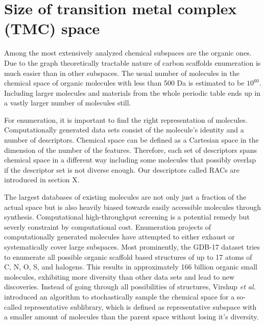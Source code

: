 \documentclass{article}
\begin{document}

\section{Size of transition metal complex (TMC) space}
Among the most extensively analyzed chemical subspaces are the organic ones. Due to the graph theoretically tractable nature of carbon scaffolds enumeration is much easier than in other subspaces. The usual number of molecules in the chemical space of organic molecules with less than 500 Da is estimated to be $10^{60}$.\cite{blair1932,polishchuk2013,bohacek1998,wester2008,triggle2009} Including larger molecules and materials from the whole periodic table ends up in a vastly larger number of molecules still.

For enumeration, it is important to find the right representation of molecules.\cite{bartok2013,ghiringhelli2015} Computationally generated data sets consist of the molecule's identity and a number of descriptors. Chemical space can be defined as a Cartesian space in the dimension of the number of the features. Therefore, each set of descriptors spans chemical space in a different way including some molecules that possibly overlap if the descriptor set is not diverse enough. Our descriptors called RACs are introduced in section X.
 
The largest databases of existing molecules are not only just a fraction of the actual space but is also heavily biased towards easily accessible molecules through synthesis.\cite{tan2005,hajduk2011,galloway2010} Computational high-throughput screening\cite{hachmann2011, jain2011, hautier2010, jensen2015, norskov2009, greeley2006, curtarolo2013, rajan2008} is a potential remedy but severly constraint by computational cost.\cite{kirkpatrick2004} Enumeration projects of computationally generated molecules have attempted to either exhaust or systematically cover\cite{virshup2013} large subspaces. Most prominently, the GDB-17 dataset\cite{ruddigkeit2012} tries to enumerate all possible organic scaffold based structures of up to 17 atoms of C, N, O, S, and halogens. This results in approximately 166 billion organic small molecules, exhibiting more diversity than other data sets and lead to new discoveries.\cite{luethi2010,nguyen2008} Instead of going through all possibilities of structures, Virshup \textit{et al.}\cite{virshup2013} introduced an algorithm to stochastically\cite{agrafiotis1997} sample the chemical space for a so-called representative sublibrary, which is defined as representative subspace with a smaller amount of molecules than the parent space without losing it's diversity.
\end{document}
